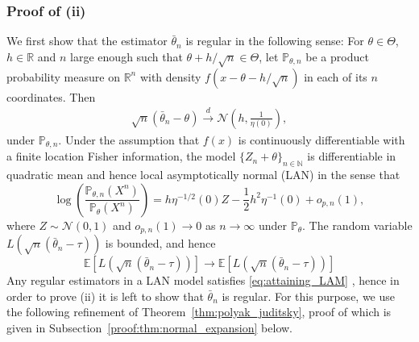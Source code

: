 \documentclass[letterpaper, 11pt]{IEEEtran}      %
\newcommand{\ex}[1]{\ensuremath{\mathbb{E}\left[ #1\right]}}
\newcommand{\Prob}{\mathbb{P} }
\newcommand{\Ncal}{\mathcal{N}}
\begin{document}
\subsubsection*{Proof of (ii)}
We first show that the estimator $\bar{\theta}_n$ is regular in the following sense: For $\theta \in \Theta$, $h\in \mathbb R$ and $n$ large enough such that $\theta+h/\sqrt{n} \in \Theta$, let $\Prob_{\theta,n}$ be a product probability measure on $\mathbb R^n$ with density $f(x-\theta - h/\sqrt{n})$ in each of its $n$ coordinates. Then 
\begin{align}
\label{eq:sgd_part2}
\sqrt{n}\left( \bar{\theta}_n - \theta\right) \overset{d}{\to} \Ncal\left( h,\frac{1}{\eta(0)}\right),
\end{align}
under $\Prob_{\theta,n}$. Under the assumption that $f(x)$ is continuously differentiable with a finite location Fisher information, the model $\{Z_n+ \theta\}_{n \in \mathbb N}$ is differentiable in quadratic mean \cite[Exm. 7.8]{van2000asymptotic} and hence local asymptotically normal (LAN) in the sense that
\[
\log \left(\frac{\Prob_{\theta,n}(X^n)}{\Prob_{\theta} (X^n) }\right) = h \eta^{-1/2}(0) Z - \frac{1}{2} h^2 \eta^{-1}(0)  + o_{p,n}(1),
\]
where $Z\sim \Ncal(0,1)$ and $o_{p,n}(1) \to 0$ as $n\to \infty$ under $\Prob_{\theta}$. 
 The random variable $L\left(\sqrt{n} \left(\bar{\theta}_n - \tau \right) \right)
$ is bounded, and hence 
\[
\ex{ L\left(\sqrt{n} \left(\bar{\theta}_n - \tau \right) \right)} \to \ex{L\left(\sqrt{n} \left(\bar{\theta}_n - \tau \right) \right)}
\]
Any regular estimators in a LAN model satisfies \eqref{eq:attaining_LAM} \cite{beran1995role}, hence in order to prove (ii) it is left to show that $\bar{\theta}_n$ is regular. For this purpose, 
we use the following refinement of Theorem~\ref{thm:polyak_juditsky}, proof of which is given in Subsection~\ref{proof:thm:normal_expansion} below.
%
\end{document}
